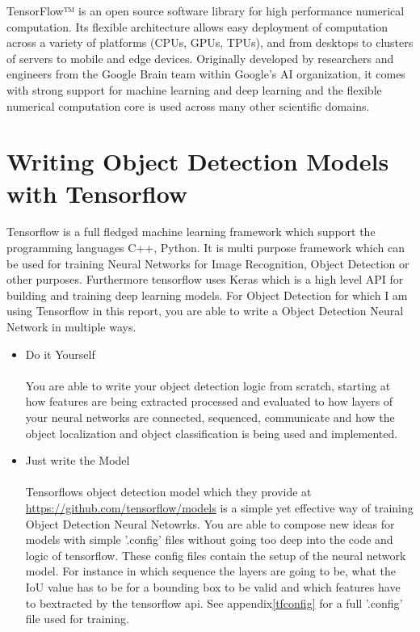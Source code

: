 
TensorFlow™ is an open source software library for high performance numerical computation. Its flexible architecture allows easy deployment
of computation across a variety of platforms (CPUs, GPUs, TPUs), and from desktops to clusters of servers to mobile and edge devices.
Originally developed by researchers and engineers from the Google Brain team within Google’s AI organization, it comes with strong support
for machine learning and deep learning and the flexible numerical computation core is used across many other scientific
domains.\cite{tensorflow}

\section{Writing Object Detection Models with Tensorflow}\label{train-with-tensorflow}
Tensorflow is a full fledged machine learning framework which support the programming languages C++, Python. It is multi purpose framework
which can be used for training Neural Networks for Image Recognition, Object Detection or other purposes. Furthermore tensorflow uses
Keras which is a high level API for building and training deep learning models. For Object Detection for which I am using Tensorflow in this
report, you are able to write a Object Detection Neural Network in multiple ways.
\begin{itemize}
    \item Do it Yourself \\ \\
        You are able to write your object detection logic from scratch, starting at how features are being extracted processed and
        evaluated to how layers of your neural networks are connected, sequenced, communicate and how the object localization and object
        classification is being used and implemented.
    \item Just write the Model \\ \\
        Tensorflows object detection model which they provide at \url{https://github.com/tensorflow/models} is a simple yet effective way of
        training Object Detection Neural Netowrks. You are able to compose new ideas for models with simple '.config' files without going
        too deep into the code and logic of tensorflow. These config files contain the setup of the neural network model. For instance in
        which sequence the layers are going to be, what the IoU value has to be for a bounding box to be valid and which features have to
        bextracted by the tensorflow api. See appendix\ref{tfconfig} for a full '.config' file used for training.
\end{itemize}

